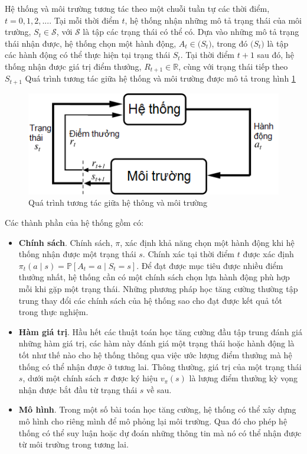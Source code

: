 Hệ thống và môi trường tương tác theo một chuỗi tuần tự các thời điểm, $t = 0,1,2,...$. Tại mỗi thời điểm $t$, hệ thống nhận những mô tả trạng thái của môi trường, $\mathit{S_t} \in \mathcal{S}$, với $\mathcal{S}$ là tập các trạng thái có thể có. Dựa vào những mô tả trạng thái nhận được, hệ thống chọn một hành động, $\mathit{A_t} \in \mathcal(\mathit{S_t})$, trong đó $\mathcal(\mathit{S_t})$ là tập các hành động có thể thực hiện tại trạng thái $\mathit{S_t}$. Tại thời điểm $t+1$ sau đó, hệ thống nhận được giá trị điểm thưởng, $\mathit{R_{t+1}} \in \mathbb{R}$, cùng với trạng thái tiếp theo $\mathit{S_{t+1}}$ Quá trình tương tác giữa hệ thống và môi trường được mô tả trong hình \ref{AgentEnvironment}

\begin{figure}
	\centering
	\includegraphics[width=\textwidth]{AgentEnvironment}
	\caption{Quá trình tương tác giữa hệ thông và môi trường}
	\label{AgentEnvironment}
\end{figure}

Các thành phần của hệ thống gồm có:
\begin{itemize}
	\item \textbf{Chính sách}. Chính sách, $\pi$, xác định khả năng chọn một hành động khi hệ thống nhận được một trạng thái $s$. Chính xác tại thời điểm $t$ được xác định $\pi_t(a \mid s) = \mathbb{P}[\mathit{A_t} = a \mid \mathit{S_t} = s]$. Để đạt được mục tiêu được nhiều điểm thưởng nhất, hệ thống cần có một chính sách chọn lựa hành động phù hợp mỗi khi gặp một trạng thái. Những phương pháp học tăng cường thường tập trung thay đổi các chính sách của hệ thống sao cho đạt được kết quả tốt trong thực nghiệm.
	\item \textbf{Hàm giá trị}. Hầu hết các thuật toán học tăng cường đầu tập trung đánh giá những hàm giá trị, các hàm này đánh giá một trạng thái hoặc hành động là tốt như thế nào cho hệ thống thông qua việc ước lượng điểm thưởng mà hệ thống có thể nhận được ở tương lai. Thông thường, giá trị của một trạng thái $s$, dưới một chính sách $\pi$  được ký hiệu $v_{\pi}(s)$ là lượng điểm thưởng kỳ vọng nhận được bắt đầu từ trạng thái $s$ về sau.
	\item \textbf{Mô hình}. Trong một số bài toán học tăng cường, hệ thống có thể xây dựng mô hình cho riêng mình để mô phỏng lại môi trường. Qua đó cho phép hệ thống có thể suy luận hoặc dự đoán những thông tin mà nó có thể nhận được từ môi trường trong tương lai.
\end{itemize}	

